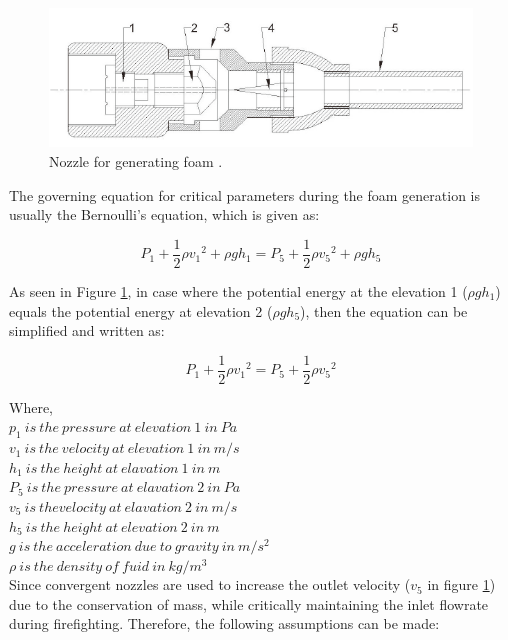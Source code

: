 \documentclass[12pt]{report}
\begin{document}
\begin{figure}[H]
    \centering
    \includegraphics[width=\textwidth]{foam_generating_nozzle.png}
    \caption{Nozzle for generating foam \cite{csb2016phenomenological}.}
    \label{ch2:figure:nozzle}
\end{figure}

The governing equation for critical parameters during the foam generation is usually the Bernoulli’s equation, which is given as:

\begin{equation}
    P_1+\frac{1}{2}\rho{v_1}^2 + \rho gh_1 = P_5+\frac{1}{2}\rho{v_5}^2 + \rho gh_5
\end{equation}

As seen in Figure \ref{ch2:figure:nozzle}, in case where the potential energy at the elevation 1 ($\rho gh_1$) equals the potential energy at elevation 2 ($\rho gh_5$), then the equation can be simplified and written as:

\begin{equation}
    P_1+\frac{1}{2}\rho{v_1}^2 = P_5+\frac{1}{2}\rho{v_5}^2
\end{equation}

\noindent Where, \\
$p_1\ is\ the\ pressure\ at\ elevation\ 1\ in\ Pa$ \\
$v_1\ is\ the\ velocity\ at\ elevation\ 1\ in\ m/s$ \\
$h_1\ is\ the\ height\ at\ elavation\ 1\ in\ m$ \\
$P_5\ is\ the\ pressure\ at\ elavation\ 2\ in\ Pa$ \\
$v_5\ is\ the velocity\ at\ elavation\ 2\ in\ m/s$ \\
$h_5\ is\ the\ height\ at\ elevation\ 2\ in\ m$ \\
$g\ is\ the\ acceleration\ due\ to\ gravity\ in\ m/s^2$ \\
$\rho\ is\ the\ density\ of\ fuid\ in\ kg/m^3$ \\

Since convergent nozzles are used to increase the outlet velocity ($v_5$  in figure \ref{ch2:figure:nozzle}) due to the conservation of mass, while critically maintaining the inlet flowrate during firefighting. Therefore, the following assumptions can be made:
\end{document}
